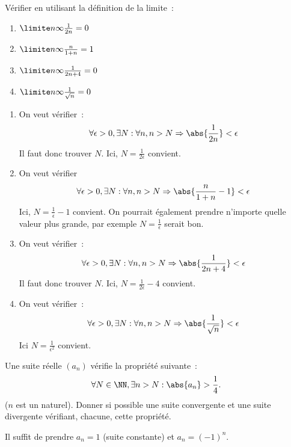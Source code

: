 \documentclass[12pt,french,oneside,a4paper]{memoir} %
\begin{document}
\begin{exo}
Vérifier en utilisant la définition de la limite~:
\begin{multicols}{2}
  \begin{enumerate}
  \item $\limite n \infty \frac 1{2n} = 0$
  \item $\limite n \infty \frac n{1+n} = 1$
  \item $\limite n \infty \frac 1{2n+4} = 0$
  \item $\limite n \infty \frac 1{\sqrt{n}} = 0$
  \end{enumerate}\par\vfill
\end{multicols}
\begin{correction}
  \begin{enumerate}
  \item On veut vérifier~:
    \begin{equation*}
      \forall \epsilon > 0, \exists N : \forall n, n > N \Rightarrow \abs{\frac{1}{2n}} < \epsilon
    \end{equation*}
    Il faut donc trouver $N$. Ici, $N = \frac{1}{2\epsilon}$ convient.
  \item On veut vérifier
    \begin{equation*}
      \forall \epsilon > 0, \exists N : \forall n, n > N \Rightarrow \abs{\frac{n}{1+n} - 1} < \epsilon
    \end{equation*}
    Ici, $N = \frac{1}{\epsilon} - 1$ convient. On pourrait également prendre n'importe quelle valeur plus grande, par exemple $N = \frac{1}{\epsilon}$ serait bon.
  \item On veut vérifier~:
    \begin{equation*}
      \forall \epsilon > 0, \exists N : \forall n, n > N \Rightarrow \abs{\frac{1}{2n+4}} < \epsilon
    \end{equation*}
    Il faut donc trouver $N$. Ici, $N = \frac{1}{2\epsilon} - 4$ convient.
  \item On veut vérifier~:
    \begin{equation*}
      \forall \epsilon > 0, \exists N : \forall n, n > N \Rightarrow \abs{\frac1{\sqrt{n}}} < \epsilon
    \end{equation*}
    Ici $N = \frac{1}{\epsilon^{2}}$ convient.
  \end{enumerate}
\end{correction}
\end{exo}
\begin{exo}
Une suite réelle $(a_{n})$ vérifie la propriété suivante~:
\begin{equation*}
  \forall N \in \NN, \exists n > N : \abs{a_{n}} > \frac 14.
\end{equation*}
($n$ est un naturel). Donner si possible une suite convergente et une suite divergente vérifiant, chacune, cette propriété.

\begin{correction}
  Il suffit de prendre $a_{n}= 1$ (suite constante) et $a_{n} = (-1)^{n}$.
\end{correction}
\end{exo}
\end{document}
